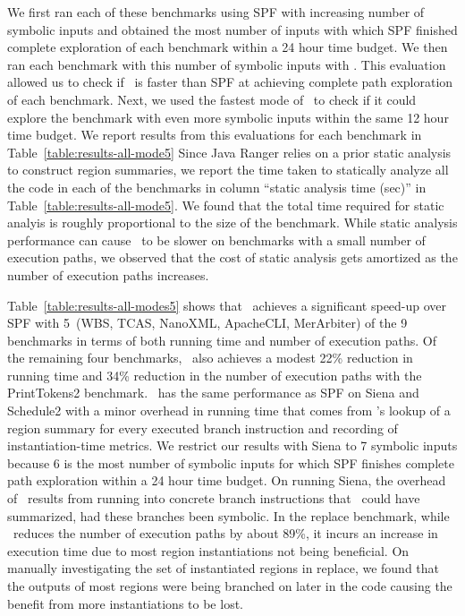 We first ran each of these benchmarks using SPF with increasing number of symbolic inputs and obtained the most number of inputs
with which SPF finished complete exploration of each benchmark within a 24 hour time budget.
%
We then ran each benchmark with this number of symbolic inputs with \tool.
%
This evaluation allowed us to check if \tool\ is faster than SPF at achieving complete path exploration of each benchmark.
%
Next, we used the fastest mode of \tool\ to check if it could explore the benchmark with even more symbolic inputs within
the same 12 hour time budget.
%
We report results from this evaluations for each benchmark in Table~\ref{table:results-all-mode5}
%
Since Java Ranger relies on a prior static analysis to construct region summaries, we report the time taken to statically
analyze all the code in each of the benchmarks in column ``static analysis time (sec)'' in
Table~\ref{table:results-all-mode5}.
%
We found that the total time required for static analyis is roughly proportional to the size of the benchmark.
%
While static analysis performance can cause \tool\ to be slower on benchmarks with a small number of execution
paths, we observed that the cost of static analysis gets amortized as the number of execution paths increases.
%

%
Table~\ref{table:results-all-modes5} shows that \tool\ achieves a significant speed-up over SPF with
5~(WBS, TCAS, NanoXML, ApacheCLI, MerArbiter) of the 9 benchmarks in terms of both running time and number of
execution paths.
%
Of the remaining four benchmarks, \tool\ also achieves a modest 22\% reduction in running time and 34\% reduction
in the number of execution paths with the PrintTokens2 benchmark.
%
\tool\ has the same performance as SPF on Siena and Schedule2 with a minor overhead in running time that comes from
\tool\rq s lookup of a region summary for every executed branch instruction and recording of instantiation-time metrics.
%
We restrict our results with Siena to 7 symbolic inputs because 6 is the most number of symbolic inputs for which
SPF finishes complete path exploration within a 24 hour time budget.
%
On running Siena, the overhead of \tool\ results from running into concrete branch instructions that
\tool\ could have summarized, had these branches been symbolic.
%
In the replace benchmark, while \tool\ reduces the number of execution paths by about 89\%, it incurs an increase in
execution time due to most region instantiations not being beneficial.
%
On manually investigating the set of instantiated regions in replace, we found that the outputs of most regions were
being branched on later in the code causing the benefit from more instantiations to be lost.
%

